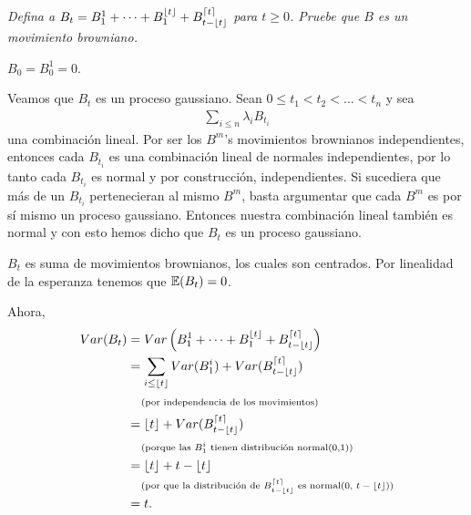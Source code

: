 \emph{
    Defina a $B_t=B^1_1+\cdots+B^{\lfloor t\rfloor}_1+B^{\lceil t \rceil}_{t-\lfloor t\rfloor}$ 
    para $t\geq 0$. Pruebe que $B$ es un movimiento browniano. 
}

\afterstatement\pn

$B_0 = B_0^1 = 0$. 

Veamos que $B_t$ es un proceso gaussiano. Sean $0 \leq t_1 < t_2 < \dots < t_n$ y sea 
\begin{align}
       \sum_{i \leq n}  \lambda_i B_{t_i}
\end{align}
una combinación lineal. Por ser los $B^m$'s movimientos brownianos independientes, entonces cada $B_{t_i}$
es una combinación lineal de normales independientes, por lo tanto cada $B_{t_i}$ es normal y por construcción, independientes.
Si sucediera que más de un $B_{t_i}$ pertenecieran al mismo $B^m$, basta argumentar que cada $B^m$ es por sí mismo un
proceso gaussiano. Entonces nuestra combinación lineal también es normal y con esto hemos dicho que $B_t$ es un proceso gaussiano.\pn

$B_{t}$ es suma de movimientos brownianos, los cuales son centrados. Por linealidad de la esperanza tenemos que
$\mathbb{E}(B_t) = 0$.\pn

Ahora, 
\begin{align}
        Var(B_t)    &=  Var\left( B^1_1+\cdots+B^{\lfloor t\rfloor}_1+B^{\lceil t \rceil}_{t-\lfloor t\rfloor} \right)                           \\
                    &=  \sum_{i \leq \lfloor t \rfloor} Var(B_1^i) + Var(B^{\lceil t \rceil}_{t-\lfloor t\rfloor})                        \\
                    &\;\;\;\;\mbox{{\scriptsize(por independencia de los movimientos)}}                                                         \\
                    &=  \lfloor t \rfloor + Var(B^{\lceil t \rceil}_{t-\lfloor t\rfloor})                                                 \\
                    &\;\;\;\;\mbox{{\scriptsize(porque las $B_1^i$ tienen distribución normal(0,1))}}                                           \\
                    &=  \lfloor t \rfloor + t - \lfloor t \rfloor                                                           \\                    
                    &\;\;\;\;\mbox{{\scriptsize(por que la distribución de $B^{\lceil t \rceil}_{t-\lfloor t\rfloor}$ es normal(0, $t - \lfloor t \rfloor$))}}\\
                    &= t.
\end{align}\pn


